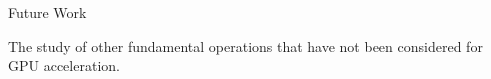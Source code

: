 \documentclass[final]{beamer}
\newlength{\sepwidth}
\newlength{\colwidth}
\newcommand{\separatorcolumn}{\begin{column}{\sepwidth}\end{column}}
\begin{document}
\begin{frame}[t]
\begin{columns}[t]
\begin{column}{\colwidth}
\begin{block}{Future Work}

\begin{description}[font=$\bullet$~\normalfont\scshape\color{red!50!black}]
\item The study of other fundamental operations that have not been considered for GPU acceleration.
\end{description}

\end{block}


\end{column}

\separatorcolumn
\end{columns}
\end{frame}
\end{document}

